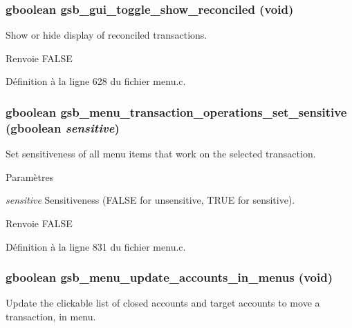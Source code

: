 \subsubsection[{gsb\_\-gui\_\-toggle\_\-show\_\-reconciled}]{\setlength{\rightskip}{0pt plus 5cm}gboolean gsb\_\-gui\_\-toggle\_\-show\_\-reconciled (void)}\label{menu_8c_aeb017cf19bed8e724d46231072994de9}
Show or hide display of reconciled transactions.

\begin{DoxyReturn}{Renvoie}
FALSE 
\end{DoxyReturn}


Définition à la ligne 628 du fichier menu.c.

\subsubsection[{gsb\_\-menu\_\-transaction\_\-operations\_\-set\_\-sensitive}]{\setlength{\rightskip}{0pt plus 5cm}gboolean gsb\_\-menu\_\-transaction\_\-operations\_\-set\_\-sensitive (gboolean {\em sensitive})}\label{menu_8c_a2cd0fa9a87d28146f743c30d75c3ee00}
Set sensitiveness of all menu items that work on the selected transaction.


\begin{DoxyParams}{Paramètres}
\item[{\em sensitive}]Sensitiveness (FALSE for unsensitive, TRUE for sensitive).\end{DoxyParams}
\begin{DoxyReturn}{Renvoie}
FALSE 
\end{DoxyReturn}


Définition à la ligne 831 du fichier menu.c.

\subsubsection[{gsb\_\-menu\_\-update\_\-accounts\_\-in\_\-menus}]{\setlength{\rightskip}{0pt plus 5cm}gboolean gsb\_\-menu\_\-update\_\-accounts\_\-in\_\-menus (void)}\label{menu_8c_a82ddd4b1a12d79cf3c8211128ef52a88}
Update the clickable list of closed accounts and target accounts to move a transaction, in menu.


